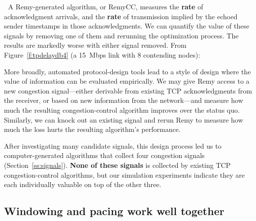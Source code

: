 \vspace{\baselineskip}
\enlargethispage{\baselineskip}

\noindent \begin{minipage}{\textwidth}

\textcolor{white}{.}\hspace{\parindent} A Remy-generated algorithm, or
RemyCC, measures the \textbf{rate} of acknowledgment arrivals, and the
\textbf{rate} of transmission implied by the echoed sender timestamps
in those acknowledgments. We can quantify the value of these signals
by removing one of them and rerunning the optimization process. The
results are markedly worse with either signal removed.  From
Figure~\ref{f:tpdelaydb4} (a 15~Mbps link with 8 contending nodes):

\begin{center}
\def\svgwidth{0.8 \textwidth}\footnotesize
\end{center}
\end{minipage}

More broadly, automated protocol-design tools lead to a style of
design where the value of information can be evaluated empirically. We
may give Remy access to a new congestion signal---either derivable
from existing TCP acknowledgments from the receiver, or based on new
information from the network---and measure how much the resulting
congestion-control algorithm improves over the status quo. Similarly,
we can knock out an existing signal and rerun Remy to measure how much
the loss hurts the resulting algorithm's performance.

After investigating many candidate signals, this design process led us
to computer-generated algorithms that collect four congestion signals
(Section~\ref{ss:signals}). \textbf{None of these signals} is
collected by existing TCP congestion-control algorithms, but our
simulation experiments indicate they are each individually valuable on
top of the other three.

\subsection{Windowing and pacing work well together}


